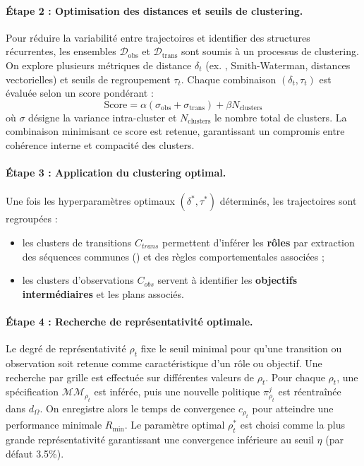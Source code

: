\paragraph{Étape 2 : Optimisation des distances et seuils de clustering.}
Pour réduire la variabilité entre trajectoires et identifier des structures récurrentes, les ensembles $\mathcal{D}_{\text{obs}}$ et $\mathcal{D}_{\text{trans}}$ sont soumis à un processus de clustering.
On explore plusieurs métriques de distance $\delta_t$ (ex. , Smith-Waterman, distances vectorielles) et seuils de regroupement $\tau_t$.
Chaque combinaison $(\delta_t, \tau_t)$ est évaluée selon un score pondérant :
\[
  \text{Score} = \alpha (\sigma_{\text{obs}} + \sigma_{\text{trans}}) + \beta N_{\text{clusters}}
\]
où $\sigma$ désigne la variance intra-cluster et $N_{\text{clusters}}$ le nombre total de clusters.
La combinaison minimisant ce score est retenue, garantissant un compromis entre cohérence interne et compacité des clusters.

\paragraph{Étape 3 : Application du clustering optimal.}
Une fois les hyperparamètres optimaux $(\delta^*, \tau^*)$ déterminés, les trajectoires sont regroupées :
\begin{itemize}
  \item les clusters de transitions $C_{trans}$ permettent d'inférer les \textbf{rôles} par extraction des séquences communes () et des règles comportementales associées ;
  \item les clusters d'observations $C_{obs}$ servent à identifier les \textbf{objectifs intermédiaires} et les plans associés.
\end{itemize}

\paragraph{Étape 4 : Recherche de représentativité optimale.}
Le degré de représentativité $\rho_t$ fixe le seuil minimal pour qu'une transition ou observation soit retenue comme caractéristique d'un rôle ou objectif.
Une recherche par grille est effectuée sur différentes valeurs de $\rho_t$.
Pour chaque $\rho_t$, une spécification $\mathcal{MM}_{\rho_t}$ est inférée, puis une nouvelle politique $\pi^j_{\rho_t}$ est réentraînée dans $d_\Omega$.
On enregistre alors le temps de convergence $c_{\rho_t}$ pour atteindre une performance minimale $R_{\min}$.
Le paramètre optimal $\rho_t^*$ est choisi comme la plus grande représentativité garantissant une convergence inférieure au seuil $\eta$ (par défaut 3.5\%).

